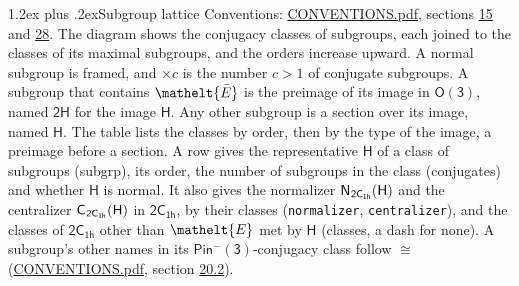 \documentclass[10pt,a4paper]{article}
\makeatletter
\renewcommand\section{\@startsection{section}{1}{\z@}{-3ex plus -1ex minus -.2ex}%
  {1.2ex plus .2ex}{\normalfont\large\sffamily\bfseries\color{parttitle}}}
\numberwithin{equation}{section}
\newcommand{\eltfont}[1]{{\let\sigma\eltsigma\mathelt{#1}}}
\newcommand{\grp}[1]{\mathsf{#1}}
\newcommand{\cls}[1]{\eltfont{#1}}
\newcommand{\elt}[1]{\eltfont{#1}}
\newcommand{\samecls}{\cong}
\newcommand{\barred}[1]{\bar{#1}}
\newcommand{\hairsp}{\mkern1mu}
\makeatother
\begin{document}
\section{Subgroup lattice}\label{s:subgroups}
Conventions: \href{../../CONVENTIONS.pdf}{CONVENTIONS.pdf}, sections \href{../../../rotation/CONVENTIONS.pdf\#conv.15}{15} and \href{../../CONVENTIONS.pdf\#conv.28}{28}.
The diagram shows the conjugacy classes of subgroups, each joined to the classes of its maximal subgroups, and the orders increase upward. \label{n:index.conjugates.c}A normal subgroup is framed, and ${\times}c$ is the number $c > 1$ of conjugate subgroups. \label{n:group.H}A subgroup that contains $\elt{\barred{E}}$ is the preimage of its image in $\grp{O(3)}$, named $\grp{2H}$ for the image $\grp{H}$. Any other subgroup is a section over its image, named $\grp{H}$. The table lists the classes by order, then by the type of the image, a preimage before a section. \label{n:head.subgroup}\label{n:head.order}\label{n:head.conjugates}\label{n:head.normal}A row gives the representative $\grp{H}$ of a class of subgroups (subgrp), its order, the number of subgroups in the class (conjugates) and whether $\grp{H}$ is normal. \label{n:group.normalizer}\label{n:group.centralizer}\label{n:head.classes}It also gives the normalizer $\grp{N}_{\hairsp \grp{2C_{1h}}}(\grp{H})$ and the centralizer $\grp{C}_{\hairsp \grp{2C_{1h}}}(\grp{H})$ in $\grp{2C_{1h}}$, by their classes (\texttt{normalizer}, \texttt{centralizer}), and the classes of $\grp{2C_{1h}}$ other than $\cls{E}$ met by $\grp{H}$ (classes, a dash for none). A subgroup's other names in its \href{Pinminus3.pdf}{$\grp{Pin^{-}(3)}$}-conjugacy class follow $\samecls$ (\href{../../CONVENTIONS.pdf}{CONVENTIONS.pdf}, section \href{../../CONVENTIONS.pdf\#conv.20.2}{20.2}).
\begin{center}
\end{center}
\end{document}
